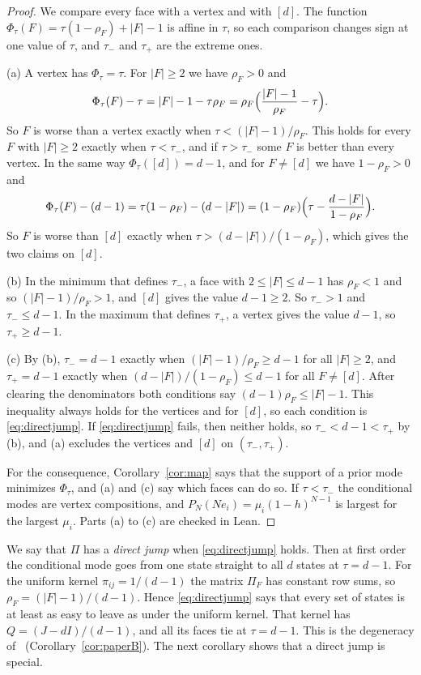 \begin{proof}
We compare every face with a vertex and with $[d]$. The function
$\Phi_\tau(F)=\tau(1-\rho_F)+|F|-1$ is affine in $\tau$, so each comparison
changes sign at one value of $\tau$, and $\tau_-$ and $\tau_+$ are the extreme
ones.

(a) A vertex has $\Phi_\tau=\tau$. For $|F|\ge2$ we have $\rho_F>0$ and
\[
 \Phi_\tau(F)-\tau=|F|-1-\tau\rho_F=\rho_F\Bigl(\frac{|F|-1}{\rho_F}-\tau\Bigr).
\]
So $F$ is worse than a vertex exactly when $\tau<(|F|-1)/\rho_F$. This holds
for every $F$ with $|F|\ge2$ exactly when $\tau<\tau_-$, and if $\tau>\tau_-$
some $F$ is better than every vertex. In the same way $\Phi_\tau([d])=d-1$,
and for $F\ne[d]$ we have $1-\rho_F>0$ and
\[
 \Phi_\tau(F)-(d-1)=\tau(1-\rho_F)-(d-|F|)
 =(1-\rho_F)\Bigl(\tau-\frac{d-|F|}{1-\rho_F}\Bigr).
\]
So $F$ is worse than $[d]$ exactly when $\tau>(d-|F|)/(1-\rho_F)$, which gives
the two claims on $[d]$.

(b) In the minimum that defines $\tau_-$, a face with $2\le|F|\le d-1$ has
$\rho_F<1$ and so $(|F|-1)/\rho_F>1$, and $[d]$ gives the value $d-1\ge2$. So
$\tau_->1$ and $\tau_-\le d-1$. In the maximum that defines $\tau_+$, a vertex
gives the value $d-1$, so $\tau_+\ge d-1$.

(c) By (b), $\tau_-=d-1$ exactly when $(|F|-1)/\rho_F\ge d-1$ for all
$|F|\ge2$, and $\tau_+=d-1$ exactly when $(d-|F|)/(1-\rho_F)\le d-1$ for all
$F\ne[d]$. After clearing the denominators both conditions say
$(d-1)\rho_F\le|F|-1$. This inequality always holds for the vertices and for
$[d]$, so each condition is \eqref{eq:directjump}. If
\eqref{eq:directjump} fails, then neither holds, so $\tau_-<d-1<\tau_+$ by
(b), and (a) excludes the vertices and $[d]$ on $(\tau_-,\tau_+)$.

For the consequence, Corollary~\ref{cor:map} says that the support of a prior
mode minimizes $\Phi_\tau$, and (a) and (c) say which faces can do so. If
$\tau<\tau_-$ the conditional modes are vertex compositions, and
$P_N(Ne_i)=\mu_i(1-h)^{N-1}$ is largest for the largest $\mu_i$. Parts (a) to
(c) are checked in Lean.
\end{proof}

We say that $\Pi$ has a \emph{direct jump} when \eqref{eq:directjump} holds.
Then at first order the conditional mode goes from one state straight to all $d$ states at
$\tau=d-1$. For the uniform kernel $\pi_{ij}=1/(d-1)$ the matrix $\Pi_F$ has
constant row sums, so $\rho_F=(|F|-1)/(d-1)$. Hence
\eqref{eq:directjump} says that every set of states is at least as easy to
leave as under the uniform kernel. That kernel has $Q=(J-dI)/(d-1)$, and all its faces tie at
$\tau=d-1$. This is the degeneracy of~\cite{paperB} (Corollary~\ref{cor:paperB}).
The next corollary shows that a direct jump is special.

